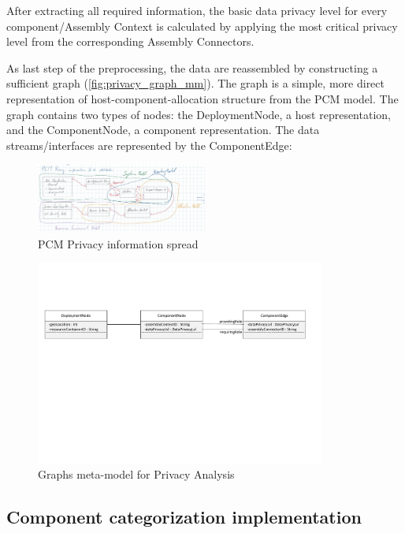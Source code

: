 After extracting all required information, the basic data privacy level for every component/Assembly Context is calculated by applying the most critical privacy level from the corresponding Assembly Connectors.

As last step of the preprocessing, the data are reassembled by constructing a sufficient graph (\autoref{fig:privacy_graph_mm}). The graph is a simple, more direct representation of host-component-allocation structure from the PCM model. The graph contains two types of nodes: the DeploymentNode, a host representation, and the ComponentNode, a component representation. The data streams/interfaces are represented by the ComponentEdge:

\begin{figure}[h]
	\centering
	\includegraphics[width=0.5\textwidth]{pictures/pcm_info_spread}
	\caption{PCM Privacy information spread}
	\label{fig:pcm_info_spread}
\end{figure}

\begin{figure}[h]
	\centering
	\includegraphics[trim = 00mm 120mm 15mm 50mm, clip, width=0.85\textwidth]{pictures/modelGraph_metamodel}
	\caption{Graphs meta-model for Privacy Analysis}
	\label{fig:privacy_graph_mm}
\end{figure}


\subsection{Component categorization implementation}

